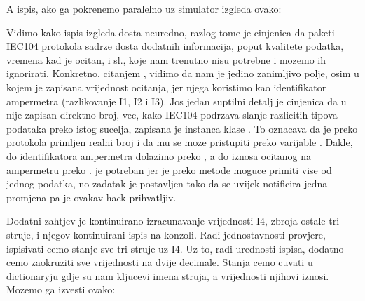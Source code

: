 \documentclass[letterpaper,10pt,croatian]{sphinxmanual}
\begin{document}
\sphinxAtStartPar
A ispis, ako ga pokrenemo paralelno uz simulator izgleda ovako:

\noindent{}

\sphinxAtStartPar
Vidimo kako ispis izgleda dosta neuredno, razlog tome je cinjenica da paketi
IEC104 protokola sadrze dosta dodatnih informacija, poput kvalitete podatka,
vremena kad je ocitan, i sl., koje nam trenutno nisu potrebne i mozemo ih
ignorirati. Konkretno, citanjem , vidimo da nam je jedino
zanimljivo polje, osim  u kojem je zapisana vrijednost ocitanja,
 jer njega koristimo kao identifikator ampermetra (razlikovanje
I1, I2 i I3). Jos jedan suptilni detalj je cinjenica da u  nije
zapisan direktno broj, vec, kako IEC104 podrzava slanje razlicitih tipova
podataka preko istog sucelja, zapisana je instanca klase
.
To oznacava da je preko protokola primljen realni broj i da mu se moze
pristupiti preko varijable . Dakle,
do identifikatora ampermetra dolazimo preko , a do
iznosa ocitanog na ampermetru preko . \sphinxcode{\sphinxupquote{{[}0{]}}} je
potreban jer je preko  metode moguce primiti vise od jednog podatka,
no zadatak je postavljen tako da se uvijek notificira jedna promjena pa je
ovakav hack prihvatljiv.

\sphinxAtStartPar
Dodatni zahtjev je kontinuirano izracunavanje vrijednosti I4, zbroja ostale tri
struje, i njegov kontinuirani ispis na konzoli. Radi jednostavnosti provjere,
ispisivati cemo stanje sve tri struje uz I4. Uz to, radi urednosti ispisa,
dodatno cemo zaokruziti sve vrijednosti na dvije decimale. Stanja cemo cuvati u
dictionary\sphinxhyphen{}ju gdje su nam kljucevi imena struja, a vrijednosti njihovi iznosi.
Mozemo ga izvesti ovako:
\end{document}

